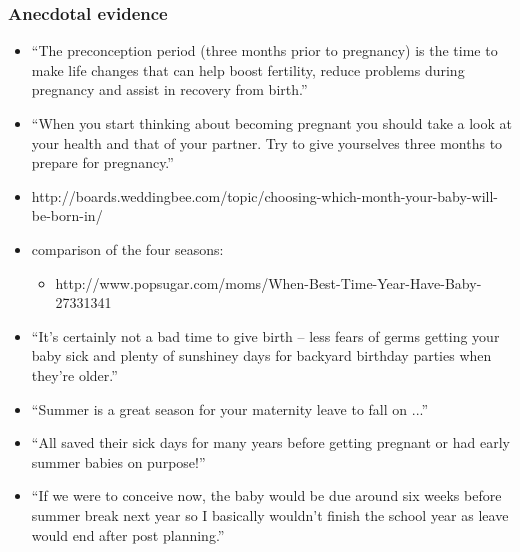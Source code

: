 \documentclass[10pt,letterpaper,subeqn]{beamer}
\begin{document}
\begin{frame}[label=Motivation3]
\frametitle{Anecdotal evidence}
\begin{itemize}
\item ``The preconception period (three months prior to pregnancy) is the time to make life changes that can help boost fertility, reduce problems during pregnancy and assist in recovery from birth.''
\item ``When you start thinking about becoming pregnant you should take a look at your health and that of your partner. Try to give yourselves three months to prepare for pregnancy.''
\item http://boards.weddingbee.com/topic/\textcolor[rgb]{0.00,0.00,1.00}{choosing-which-month-your-baby-will-be-born-in}/
\item comparison of the four seasons:
\begin{itemize}
\item http://www.popsugar.com/moms/\textcolor[rgb]{0.00,0.00,1.00}{When-Best-Time-Year-Have-Baby}-27331341
\end{itemize}
\item ``It's certainly not a bad time to give birth -- less fears of germs getting your baby sick and plenty of sunshiney days for backyard birthday parties when they're older.''
\item ``Summer is a great season for your maternity leave to fall on ...''
\item ``All saved their sick days for many years before getting pregnant or had early summer babies on purpose!''
\item ``If we were to conceive now, the baby would be due around six weeks before summer break next year so I basically wouldn't finish the school year as leave would end after post planning.''%
\end{itemize}
\end{frame}
\end{document}
